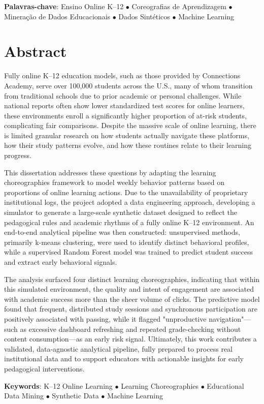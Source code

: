 \vspace{\fill}
\begin{flushleft}
{\Large \textbf{Palavras-chave}:} 
Ensino Online K--12 \(\bullet\) 
Coreografias de Aprendizagem \(\bullet\)
Mineração de Dados Educacionais \(\bullet\)
Dados Sintéticos \(\bullet\)
Machine Learning
\end{flushleft}
\vspace*{24mm}

\acresetall %

\chapter*{Abstract}
%
Fully online K--12 education models, such as those provided by Connections Academy, serve over 100,000 students across the U.S., many of whom transition from traditional schools due to prior academic or personal challenges. While national reports often show lower standardized test scores for online learners, these environments enroll a significantly higher proportion of at-risk students, complicating fair comparisons. Despite the massive scale of online learning, there is limited granular research on how students actually navigate these platforms, how their study patterns evolve, and how these routines relate to their learning progress.

This dissertation addresses these questions by adapting the learning choreographies framework to model weekly behavior patterns based on proportions of online learning actions. Due to the unavailability of proprietary institutional logs, the project adopted a data engineering approach, developing a simulator to generate a large-scale synthetic dataset designed to reflect the pedagogical rules and academic rhythms of a fully online K--12 environment. An end-to-end analytical pipeline was then constructed: unsupervised methods, primarily k-means clustering, were used to identify distinct behavioral profiles, while a supervised Random Forest model was trained to predict student success and extract early behavioral signals.

The analysis surfaced four distinct learning choreographies, indicating that within this simulated environment, the quality and intent of engagement are associated with academic success more than the sheer volume of clicks. The predictive model found that frequent, distributed study sessions and synchronous participation are positively associated with passing, while it flagged "unproductive navigation"---such as excessive dashboard refreshing and repeated grade-checking without content consumption---as an early risk signal. Ultimately, this work contributes a validated, data-agnostic analytical pipeline, fully prepared to process real institutional data and to support educators with actionable insights for early pedagogical interventions.

\vspace{\fill}
\begin{flushleft}
{\Large \textbf{Keywords}:} 
K--12 Online Learning \(\bullet\) 
Learning Choreographies \(\bullet\)
Educational Data Mining \(\bullet\)
Synthetic Data \(\bullet\)
Machine Learning
\end{flushleft}
\vspace*{24mm}

\acresetall %
